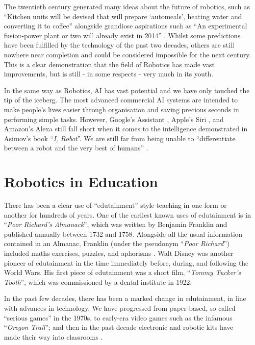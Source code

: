 \documentclass{report}
\newcommand{\tit}[1]{\textit{#1}}
\newcommand{\propernoun}[1]{\enquote{\tit{#1}}}
\begin{document}
    The twentieth century generated many ideas about the future of robotics, such as \enquote{Kitchen units will be devised that will prepare \enquote{automeals}, heating water and converting it to coffee} alongside grandiose aspirations such as \enquote{An experimental fusion-power plant or two will already exist in 2014} \cite{Asimov1964}. Whilst some predictions have been fulfilled by the technology of the past two decades, others are still nowhere near completion and could be considered impossible for the next century. This is a clear demonstration that the field of Robotics has made vast improvements, but is still - in some respects - very much in its youth.
    
    In the same way as Robotics, AI has vast potential and we have only touched the tip of the iceberg. The most advanced commercial AI systems are intended to make people's lives easier through organisation and saving precious seconds in performing simple tasks. However, Google's Assistant \cite{Google2016}, Apple's Siri \cite{Apple2011}, and Amazon's Alexa \cite{Amazon2014} still fall short when it comes to the intelligence demonstrated in Asimov's book \propernoun{I, Robot}. We are still far from being unable to \enquote{differentiate between a robot and the very best of humans} \cite{Asimov1970}.
    
    \section{Robotics in Education}
    There has been a clear use of \enquote{edutainment} style teaching in one form or another for hundreds of years. One of the earliest known uses of edutainment is in \propernoun{Poor Richard's Almanack}, which was written by Benjamin Franklin and published annually between 1732 and 1758. Alongside all the usual information contained in an Almanac, Franklin (under the pseudonym \propernoun{Poor Richard}) included maths exercises, puzzles, and aphorisms \cite{Beato2015, Franklin1732}. Walt Disney was another pioneer of edutainment in the time immediately before, during, and following the World Wars. His first piece of edutainment was a short film, \propernoun{Tommy Tucker's Tooth}, which was commissioned by a dental institute in 1922.
    
    In the past few decades, there has been a marked change in edutainment, in line with advances in technology. We have progressed from paper-based, so called \enquote{serious games} in the 1970s, to early-era video games such as the infamous \propernoun{Oregon Trail}; and then in the past decade electronic and robotic kits have made their way into classrooms \cite{Becker}.
    
\end{document}
